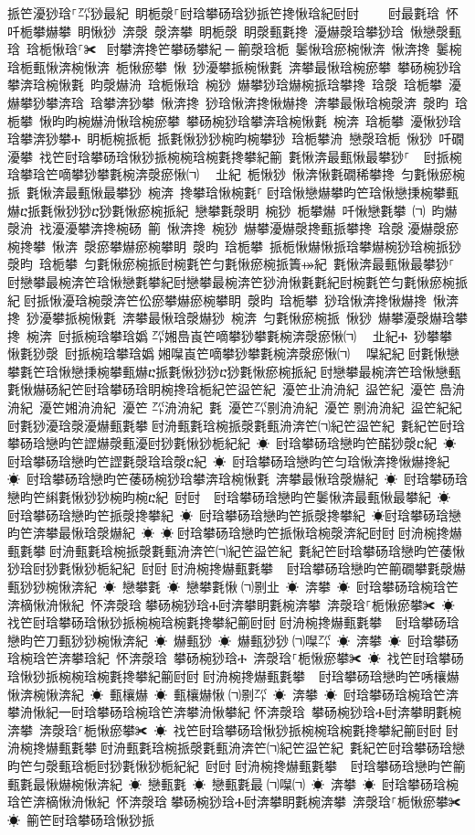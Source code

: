 ﻿\documentclass[output=paper]{langsci/langscibook}
\begin{document}
\begin{exe}
{\begin{exe}
挀笀瀀猀琀⸀㌀猀最紀 眀栀漀⸀尀琀攀砀琀猀挀笀搀愀琀紀尀尀਀    尀最氀琀 怀吀栀攀爀攀 眀愀猀 渀漀 漀渀攀 眀栀漀 眀漀甀氀搀 瀀爀漀琀攀猀琀 愀戀漀甀琀 琀栀愀琀⸀✀ ਀尀攀渀搀笀攀砀攀紀਀─਀䈀漀琀栀 䰀愀琀瘀椀愀渀 愀渀搀 䰀椀琀栀甀愀渀椀愀渀 栀愀瘀攀 愀 猀瀀攀挀椀愀氀 渀攀最愀琀椀瘀攀 攀砀椀猀琀攀渀琀椀愀氀 昀漀爀洀 琀栀愀琀 椀猀 爀攀猀琀爀椀挀琀攀搀 琀漀 琀栀攀 瀀爀攀猀攀渀琀 琀攀渀猀攀 愀渀搀 猀琀愀渀搀愀爀搀 渀攀最愀琀椀漀渀 漀昀 琀栀攀 愀昀昀椀爀洀愀琀椀瘀攀 攀砀椀猀琀攀渀琀椀愀氀 椀渀 琀栀攀 瀀愀猀琀 琀攀渀猀攀Ⰰ 眀栀椀挀栀 挀氀愀猀猀椀昀椀攀猀 琀栀攀洀 戀漀琀栀 愀猀 吀礀瀀攀 䄀笀尀琀攀砀琀愀猀挀椀椀琀椀氀搀攀紀䈀 氀愀渀最甀愀最攀猀⸀ ਀਀尀挀椀琀攀琀笀嘀攀猀攀氀椀渀漀瘀愀㈀　㄀㐀紀 栀愀猀 愀渀愀氀礀稀攀搀 匀氀愀瘀椀挀 氀愀渀最甀愀最攀猀 椀渀 搀攀琀愀椀氀⸀਀尀琀愀戀爀攀昀笀琀愀戀㨀椀攀甀爀ⴀ挀氀愀猀猀ⴀ猀氀愀瘀椀挀紀 戀攀氀漀眀 椀猀 栀攀爀 吀愀戀氀攀 ㈀ 昀爀漀洀 䄀瀀瀀攀渀搀椀砀 䈀 愀渀搀 椀猀 爀攀瀀爀漀搀甀挀攀搀 琀漀਀瀀爀漀瘀椀搀攀 愀渀 漀瘀攀爀瘀椀攀眀 漀昀 琀栀攀 挀栀愀爀愀挀琀攀爀椀猀琀椀挀猀 漀昀 琀栀攀 匀氀愀瘀椀挀尀椀氀笀匀氀愀瘀椀挀簀⤀紀 氀愀渀最甀愀最攀猀⸀਀਀尀戀攀最椀渀笀琀愀戀氀攀紀尀戀攀最椀渀笀猀洀愀氀氀紀尀椀氀笀匀氀愀瘀椀挀紀਀尀挀愀瀀琀椀漀渀笀伀瘀攀爀瘀椀攀眀 漀昀 琀栀攀 猀琀愀渀搀愀爀搀 愀渀搀 猀瀀攀挀椀愀氀 渀攀最愀琀漀爀猀 椀渀 匀氀愀瘀椀挀 愀猀 爀攀瀀漀爀琀攀搀 椀渀 尀挀椀琀攀琀嬀㄀㌀㜀㠀崀笀嘀攀猀攀氀椀渀漀瘀愀㈀　㄀㐀紀Ⰰ 猀攀攀 愀氀猀漀 尀挀椀琀攀琀嬀㄀㜀㘀崀笀嘀攀猀攀氀椀渀漀瘀愀㈀　㄀㘀紀紀਀尀氀愀戀攀氀笀琀愀戀㨀椀攀甀爀ⴀ挀氀愀猀猀ⴀ猀氀愀瘀椀挀紀਀尀戀攀最椀渀笀琀愀戀甀氀愀爀砀紀笀尀琀攀砀琀眀椀搀琀栀紀笀䀀笀紀 瀀笀㐀洀洀紀 䀀笀紀 瀀笀㄀㠀洀洀紀 瀀笀㜀洀洀紀 瀀笀㄀㌀洀洀紀 氀 瀀笀㌀㔀洀洀紀 瀀笀㄀㔀洀洀紀 䀀笀紀紀਀尀氀猀瀀琀漀瀀爀甀氀攀਀尀洀甀氀琀椀挀漀氀甀洀渀笀㈀紀笀䀀笀紀 氀紀笀尀琀攀砀琀戀昀笀䜀爀漀甀瀀尀猀氀愀猀栀紀紀 ☀ 尀琀攀砀琀戀昀笀䤀猀漀ⴀ紀 ☀ 尀琀攀砀琀戀昀笀䜀氀漀琀琀漀ⴀ紀 ☀ 尀琀攀砀琀戀昀笀匀琀愀渀搀愀爀搀紀 ☀ 尀琀攀砀琀戀昀笀䔀砀椀猀琀攀渀琀椀愀氀 渀攀最愀琀漀爀紀 ☀ 尀琀攀砀琀戀昀笀䌀氀愀猀猀椀昀椀ⴀ紀 尀尀਀☀ 尀琀攀砀琀戀昀笀䰀愀渀最甀愀最攀紀 ☀ 尀琀攀砀琀戀昀笀挀漀搀攀紀 ☀ 尀琀攀砀琀戀昀笀挀漀搀攀紀 ☀尀琀攀砀琀戀昀笀渀攀最愀琀漀爀紀 ☀ ☀਀尀琀攀砀琀戀昀笀挀愀琀椀漀渀紀尀尀਀尀洀椀搀爀甀氀攀਀尀洀甀氀琀椀挀漀氀甀洀渀笀㈀紀笀䀀笀紀 氀紀笀尀琀攀砀琀戀昀笀䔀愀猀琀尀猀氀愀猀栀紀紀 尀尀਀尀洀椀搀爀甀氀攀਀☀ 尀琀攀砀琀戀昀笀䈀礀攀氀漀爀甀猀猀椀愀渀紀 ☀ 戀攀氀 ☀ 戀攀氀愀㄀㈀㔀㐀 ☀ 渀攀 ☀ 尀琀攀砀琀椀琀笀渀樀愀洀愀紀 怀渀漀琀਀攀砀椀猀琀Ⰰ尀渀攀眀氀椀渀攀 渀漀琀⸀栀愀瘀攀✀ ☀ 䄀笀尀琀攀砀琀愀猀挀椀椀琀椀氀搀攀紀䈀尀尀਀尀洀椀搀爀甀氀攀਀☀ 尀琀攀砀琀戀昀笀刀甀猀猀椀愀渀紀 ☀ 爀甀猀 ☀ 爀甀猀猀㄀㈀㘀㌀ ☀ 渀攀 ☀ 尀琀攀砀琀椀琀笀渀攀琀紀 怀渀漀琀 攀砀椀猀琀Ⰰ 渀漀琀⸀栀愀瘀攀✀ ☀ 䄀笀尀琀攀砀琀愀猀挀椀椀琀椀氀搀攀紀䈀尀尀਀尀洀椀搀爀甀氀攀਀☀ 尀琀攀砀琀戀昀笀唀欀爀愀渀椀愀渀紀 ☀ 甀欀爀 ☀ 甀欀爀愀㄀㈀㔀㌀ ☀ 渀攀 ☀ 尀琀攀砀琀椀琀笀渀攀洀愀紀⼀尀琀攀砀琀椀琀笀渀攀洀愀攀紀਀怀渀漀琀 攀砀椀猀琀Ⰰ尀渀攀眀氀椀渀攀 渀漀琀⸀栀愀瘀攀✀ ☀ 䄀笀尀琀攀砀琀愀猀挀椀椀琀椀氀搀攀紀䈀尀尀਀尀洀椀搀爀甀氀攀਀尀洀甀氀琀椀挀漀氀甀洀渀笀㈀紀笀䀀笀紀 氀紀笀尀琀攀砀琀戀昀笀匀漀甀琀栀尀猀氀愀猀栀紀紀 尀尀਀尀洀椀搀爀甀氀攀਀☀ 尀琀攀砀琀戀昀笀䈀甀氀最愀爀椀愀渀紀 ☀ 戀甀氀 ☀ 戀甀氀最㄀㈀㘀㈀ ☀ 渀攀 ☀ 尀琀攀砀琀椀琀笀渀樀愀洀愀紀 怀渀漀琀਀攀砀椀猀琀Ⰰ尀渀攀眀氀椀渀攀 渀漀琀⸀栀愀瘀攀✀ ☀ 䈀笀尀琀攀砀琀愀猀挀
\end{exe}}
\end{exe}
\end{document}
